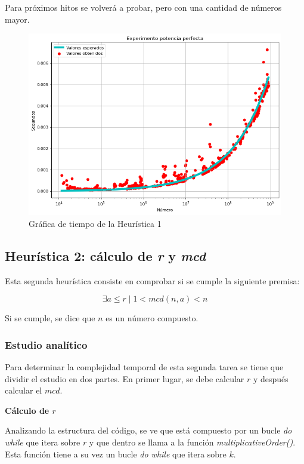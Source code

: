 \documentclass{uc3mpracticas}
\begin{document}
Para próximos hitos se volverá a probar, pero con una cantidad de números mayor.

\begin{figure}[!h]
  \centering
  \includegraphics[width=.8\linewidth]{./Images/h1.png}
  \caption{Gráfica de tiempo de la Heurística 1}
  \label{fig:h1}
\end{figure}



\subsection{Heurística 2: cálculo de \textit{r} y \textit{mcd}}

Esta segunda heurística consiste en comprobar si se cumple la siguiente premisa:

$$ \exists a \leq r \mid 1 < mcd(n,a) < n $$

Si se cumple, se dice que $n$ es un número compuesto.


\subsubsection{Estudio analítico}
Para determinar la complejidad temporal de esta segunda tarea se tiene que dividir el estudio en dos partes. En primer lugar, se debe calcular $r$ y después calcular el $mcd$.

\vspace{4mm}

\textbf{Cálculo de $r$}

\vspace{2mm}


Analizando la estructura del código, se ve que está compuesto por un bucle \textit{do while} que itera sobre $r$ y que dentro se llama a la función \textit{multiplicativeOrder()}. Esta función tiene a su vez un bucle \textit{do while} que itera sobre $k$.
\end{document}
